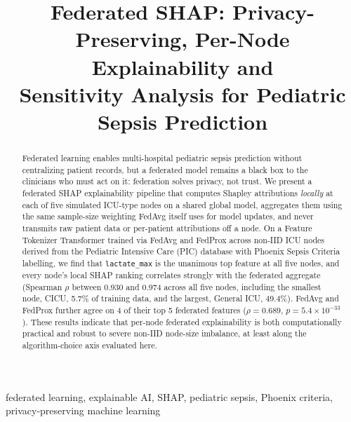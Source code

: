 \documentclass[conference]{IEEEtran}
\begin{document}
\IEEEoverridecommandlockouts

\title{Federated SHAP: Privacy-Preserving, Per-Node Explainability and\\
Sensitivity Analysis for Pediatric Sepsis Prediction}

\author{
}

\maketitle

\begin{abstract}
Federated learning enables multi-hospital pediatric sepsis prediction without
centralizing patient records, but a federated model remains a black box to
the clinicians who must act on it: federation solves privacy, not trust. We
present a federated SHAP explainability pipeline that computes Shapley
attributions \emph{locally} at each of five simulated ICU-type nodes on a
shared global model, aggregates them using the same sample-size weighting
FedAvg itself uses for model updates, and never transmits raw patient data
or per-patient attributions off a node. On a Feature Tokenizer Transformer
trained via FedAvg and FedProx across non-IID ICU nodes derived from the
Pediatric Intensive Care (PIC) database with Phoenix Sepsis Criteria
labelling, we find that \texttt{lactate\_max} is the unanimous top feature
at all five nodes, and every node's local SHAP ranking correlates strongly
with the federated aggregate (Spearman $\rho$ between 0.930 and 0.974
across all five nodes, including the smallest node, CICU, 5.7\% of
training data, and the largest, General ICU, 49.4\%). FedAvg and FedProx
further agree on 4 of their top 5 federated features
($\rho = 0.689$, $p = 5.4\times10^{-33}$). These results indicate that
per-node federated explainability is both computationally practical and
robust to severe non-IID node-size imbalance, at least along the
algorithm-choice axis evaluated here.
\end{abstract}

\begin{IEEEkeywords}
federated learning, explainable AI, SHAP, pediatric sepsis, Phoenix criteria, privacy-preserving machine learning
\end{IEEEkeywords}
\end{document}
